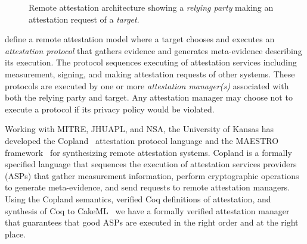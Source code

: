 \documentclass[runningheads]{llncs}
\begin{document}
\begin{figure}[hbtp]
  \centering
  \caption{Remote attestation architecture
  showing a \emph{relying party} making an attestation request of a
  \emph{target}.}
  \label{fig:remote-attestation}
\end{figure}

\citet{Coker::Principles-of-R,Coker:08:Attestation:-Ev} define a remote
attestation model where a target chooses and executes an \emph{attestation protocol} that
gathers evidence and generates meta-evidence describing its execution. The protocol
sequences executing of attestation services including measurement, signing, and
making attestation requests of other systems.  These protocols are executed by
one or more \emph{attestation manager(s)} associated with both the relying party
and target.  Any attestation manager may choose not to execute a protocol if its
privacy policy would be violated.

Working with MITRE, JHUAPL, and NSA, the University of Kansas has developed the
Copland~\citep{Ramsdell:2019aa} attestation protocol language and the MAESTRO
framework~\citep{petz2022innovations,
Petz:2024:Verified-Configuration-and-Deployment-Paper}
for synthesizing remote attestation systems. Copland is a formally specified
language that sequences the execution of attestation services providers (ASPs)
that gather measurement information, perform cryptographic operations to
generate meta-evidence, and send requests to remote attestation managers. Using
the Copland semantics, verified Coq definitions of attestation, and
synthesis of Coq to CakeML~\citep{Kumar:2014:CVI:2535838.2535841} we have a
formally verified attestation manager that guarantees that good ASPs are
executed in the right order and at the right place.
\end{document}
